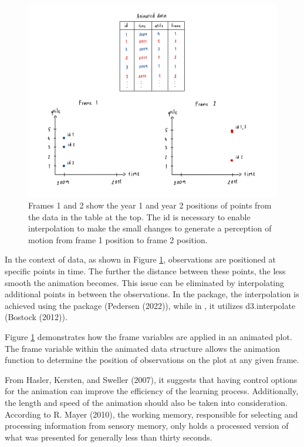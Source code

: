 \begin{figure}

{\centering \includegraphics[width=1\linewidth]{figures/animated-diagram} 

}

\caption{Frames 1 and 2 show the year 1 and year 2 positions of points from the data in the table at the top. The id is necessary to enable interpolation to make the small changes to generate a perception of motion from frame 1 position to frame 2 position.}\label{fig:animated-diagram}
\end{figure}

In the context of data, as shown in Figure \ref{fig:animated-diagram}, observations are positioned at specific points in time. The further the distance between these points, the less smooth the animation becomes. This issue can be eliminated by interpolating additional points in between the observations. In the  package, the interpolation is achieved using the  package (Pedersen (2022)), while in , it utilizes d3.interpolate (Bostock (2012)).

Figure \ref{fig:animated-diagram} demonstrates how the frame variables are applied in an animated plot. The frame variable within the animated data structure allows the animation function to determine the position of observations on the plot at any given frame.

From Hasler, Kersten, and Sweller (2007), it suggests that having control options for the animation can improve the efficiency of the learning process. Additionally, the length and speed of the animation should also be taken into consideration. According to R. Mayer (2010), the working memory, responsible for selecting and processing information from sensory memory, only holds a processed version of what was presented for generally less than thirty seconds.

